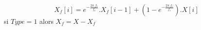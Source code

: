 \[
X_f[i] = e^{-\frac{2\pi.f_c}{f_e}}.X_f[i-1] + 
         \left( 1 - e^{-\frac{2\pi.f_c}{f_e}} \right). X[i]
\]
si $Type = 1$ alors $X_f = X - X_f$
